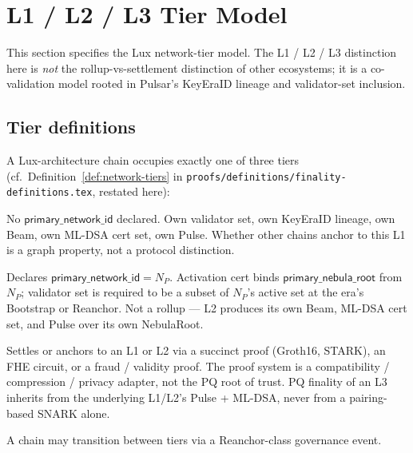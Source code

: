 \section{L1 / L2 / L3 Tier Model}
\label{sec:tier-model}

This section specifies the Lux network-tier model. The L1 / L2 / L3 distinction here is \emph{not} the rollup-vs-settlement distinction of other ecosystems; it is a co-validation model rooted in Pulsar's KeyEraID lineage and validator-set inclusion.

\subsection{Tier definitions}

\begin{definition}
\label{def:network-tiers-horizon}
A Lux-architecture chain occupies exactly one of three tiers (cf.\ Definition~\ref{def:network-tiers} in \texttt{proofs/definitions/finality-definitions.tex}, restated here):
\begin{description}[leftmargin=2em,nosep]
  \item[L1 (sovereign).] No $\mathsf{primary\_network\_id}$ declared. Own validator set, own KeyEraID lineage, own Beam, own ML-DSA cert set, own Pulse. Whether other chains anchor to this L1 is a graph property, not a protocol distinction.
  \item[L2 (co-validating).] Declares $\mathsf{primary\_network\_id} = N_P$. Activation cert binds $\mathsf{primary\_nebula\_root}$ from $N_P$; validator set is required to be a subset of $N_P$'s active set at the era's Bootstrap or Reanchor. Not a rollup --- L2 produces its own Beam, ML-DSA cert set, and Pulse over its own NebulaRoot.
  \item[L3 (rollup / validity / app-execution).] Settles or anchors to an L1 or L2 via a succinct proof (Groth16, STARK), an FHE circuit, or a fraud / validity proof. The proof system is a compatibility / compression / privacy adapter, not the PQ root of trust. PQ finality of an L3 inherits from the underlying L1/L2's Pulse + ML-DSA, never from a pairing-based SNARK alone.
\end{description}
A chain may transition between tiers via a Reanchor-class governance event.
\end{definition}

